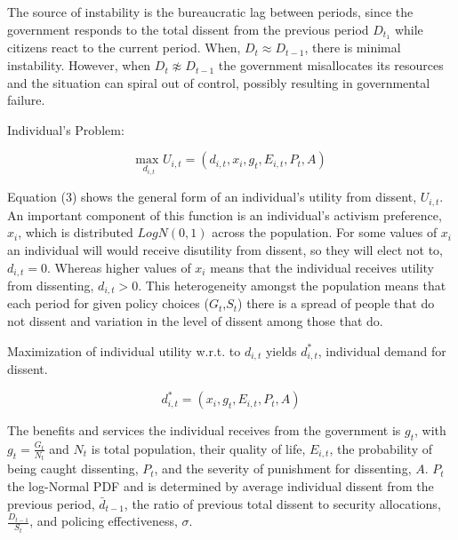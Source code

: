 \documentclass[12pt]{article}
\begin{document}
\begin{spacing}{1.5}
The source of instability is the bureaucratic lag between periods, since the government responds to the total dissent from the previous period $D_{t_1}$ while citizens react to the current period. When, $D_t \approx D_{t-1}$, there is minimal instability. However, when $D_t \not\approx D_{t-1}$ the government misallocates its resources and the situation can spiral out of control, possibly resulting in governmental failure. 

\vspace{.5 em}
\noindent Individual's Problem:

\begin{equation}
{\underset{d_{i,t}}{\text{max }}}  U_{i,t}= (d_{i,t},x_i,g_t, E_{i,t},P_t, A)
\end{equation}

Equation (3) shows the general form of an individual's utility from dissent, $U_{i,t}$. An important component of this function is an individual's activism preference, $x_i$, which is distributed $LogN(0,1)$ across the population. For some values of $x_i$ an individual will would receive disutility from dissent, so they will elect not to, $d_{i,t}=0$. Whereas higher values of $x_i$ means that the individual receives utility from dissenting, $d_{i,t}>0$. This heterogeneity amongst the population means that each period for given policy choices ($G_t$,$S_t$) there is a spread of people that do not dissent and variation in the level of dissent among those that do.  

Maximization of individual utility w.r.t. to $d_{i,t}$ yields $d_{i,t}^*$, individual demand for dissent.  

\vspace{.5 em}

\begin{equation}
d_{i,t}^*=(x_i,g_t,E_{i,t},P_t,A)
\end{equation}

The benefits and services the individual receives from the government is $g_t$, with $g_t=\frac{G_t}{N_t}$ and $N_t$ is total population, their quality of life, $E_{i,t}$, the probability of being caught dissenting, $P_t$, and the severity of punishment for dissenting, $A$. $P_t$ the log-Normal PDF and is determined by average individual dissent from the previous period, $\bar{d}_{t-1}$, the ratio of previous total dissent to security allocations, $\frac{D_{t-1}}{S_t}$, and policing effectiveness, $\sigma$. 


\end{spacing}
\end{document}
